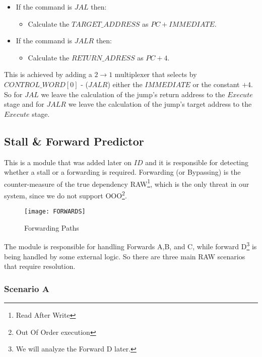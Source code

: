 \begin{itemize}
	\setlength\itemsep{-0.1em}
	\item If the command is $JAL$ then:
		\begin{itemize}
			\item Calculate the $TARGET\_ADDRESS$ as $PC+IMMEDIATE$.
		\end{itemize}
	\item If the command is $JALR$ then:
		\begin{itemize}
			\item Calculate the $RETURN\_ADRESS$ as $PC+4$.
		\end{itemize}
\end{itemize}

\vspace{2mm}

This is achieved by adding a $2\rightarrow1$ multiplexer that selects by $CONTROL\_WORD[0]$ - ($JALR$) either the $IMMEDIATE$ or the constant $+4$. So for $JAL$ we leave the calculation of the jump's return address to the $Execute$ stage and for $JALR$ we leave the calculation of the jump's target address to the $Execute$ stage.

\subsection{\textcolor{ao}{Stall \& Forward Predictor}}

This is a module that was added later on $ID$ and it is responsible for detecting whether a stall or a forwarding is required. Forwarding (or Bypassing) is the counter-measure of the true dependency RAW\footnote{Read After Write}, which is the only threat in our system, since we do not support OOO\footnote{Out Of Order execution}.

\begin{figure}[h!]
	\begin{center}
		\texttt{[image: FORWARDS]}
		\caption{Forwarding Paths}
		\label{Image3.4}
	\end{center}
\end{figure}
\vspace{2mm}

The module is responsible for handling Forwards A,B, and C, while forward D\footnote{We will analyze the Forward D later.} is being handled by some external logic. So there are three main RAW scenarios that require resolution.

\subsubsection{Scenario A} 
\label{3.2.5.1}

